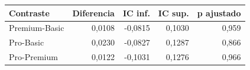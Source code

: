\begin{tabular}{lrrrr}
\toprule
Contraste & Diferencia & IC inf. & IC sup. & p ajustado \\
\midrule
Premium-Basic & 0,0108 & -0,0815 & 0,1030 & 0,959 \\
Pro-Basic & 0,0230 & -0,0827 & 0,1287 & 0,866 \\
Pro-Premium & 0,0122 & -0,1031 & 0,1276 & 0,966 \\
\bottomrule
\end{tabular}
